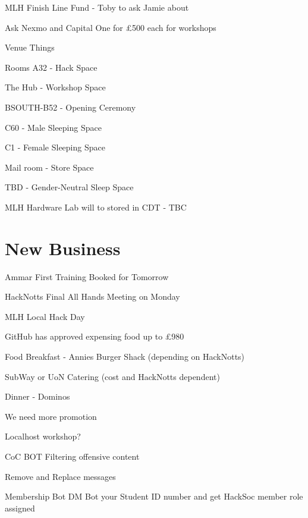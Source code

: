 \documentclass[11pt,hacksoc]{meetingmins}
\begin{document}
\begin{hiddensubitems}
		\subitem
		MLH Finish Line Fund - Toby to ask Jamie about
		
		\subitem
		Ask Nexmo and Capital One for \pounds500 each for workshops
	
	\item
	Venue Things
	
		\subitem
		Rooms
			\subsubitem
			A32 - Hack Space
			
			\subsubitem
			The Hub - Workshop Space
			
			\subsubitem
			BSOUTH-B52 - Opening Ceremony				
			
			\subsubitem
			C60 - Male Sleeping Space
			
			\subsubitem
			C1 - Female Sleeping Space
			
			\subsubitem
			Mail room - Store Space
			
			\subsubitem
			TBD - Gender-Neutral Sleep Space
			
		\subitem
		MLH Hardware Lab will to stored in CDT - TBC
			
\end{hiddensubitems}

\section{New Business}
\begin{items}
	\item
	Ammar First Training Booked for Tomorrow
	
	\item
	HackNotts Final All Hands Meeting on Monday
	
	\item
	MLH Local Hack Day
	
		\subitem
		GitHub has approved expensing food up to \pounds980
		
		\subitem
		Food
			\subsubitem
			Breakfast - Annies Burger Shack (depending on HackNotts)
			
			\subsubitem
			SubWay or UoN Catering (cost and HackNotts dependent)
			
			\subsubitem
			Dinner - Dominos
			
		\subitem
		We need more promotion
		
		\subitem
		Localhost workshop?
		
	\item
	CoC BOT
		\subitem
		Filtering offensive content
		
		\subitem
		Remove and Replace messages
		
	\item
	Membership Bot
		\subitem
		DM Bot your Student ID number and get HackSoc member role assigned
\end{items}

\vspace{1em}
\end{document}
